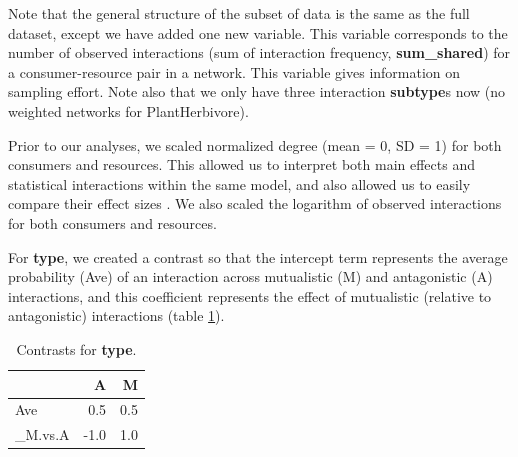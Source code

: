 \documentclass[11pt,]{article}
\newenvironment{Shaded}{}{}
\newcommand{\KeywordTok}[1]{\textcolor[rgb]{0.00,0.00,1.00}{#1}}
\newcommand{\DataTypeTok}[1]{#1}
\newcommand{\StringTok}[1]{\textcolor[rgb]{0.00,0.50,0.50}{#1}}
\newcommand{\OperatorTok}[1]{#1}
\newcommand{\NormalTok}[1]{#1}
\begin{document}
Note that the general structure of the subset of data is the same as the
full dataset, except we have added one new variable. This variable
corresponds to the number of observed interactions (sum of interaction
frequency, \textbf{sum\_shared}) for a consumer-resource pair in a
network. This variable gives information on sampling effort. Note also
that we only have three interaction \textbf{subtype}s now (no weighted
networks for PlantHerbivore).

Prior to our analyses, we scaled normalized degree (mean = 0, SD = 1)
for both consumers and resources. This allowed us to interpret both main
effects and statistical interactions within the same model, and also
allowed us to easily compare their effect sizes \citep{Schielzeth2010}.
We also scaled the logarithm of observed interactions for both consumers
and resources.

\begin{Shaded}
\end{Shaded}

For \textbf{type}, we created a contrast so that the intercept term
represents the average probability (Ave) of an interaction across
mutualistic (M) and antagonistic (A) interactions, and this coefficient
represents the effect of mutualistic (relative to antagonistic)
interactions (table \ref{tab:type-contrasts}).

\begin{table}[!h]

\caption{\label{tab:type-contrasts}Contrasts for \textbf{type}.}
\centering
\begin{tabular}{lrr}
\toprule
  & A & M\\
\midrule
Ave & 0.5 & 0.5\\
\_M.vs.A & -1.0 & 1.0\\
\bottomrule
\end{tabular}
\end{table}
\end{document}
